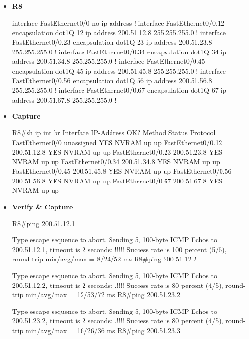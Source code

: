 \documentclass[10pt]{article}
\begin{document}
\subsection{}
\begin{itemize}
\item {\bf R8}
\begin{verbatim*}
interface FastEthernet0/0
 no ip address
!
interface FastEthernet0/0.12
 encapsulation dot1Q 12
 ip address 200.51.12.8 255.255.255.0
!
interface FastEthernet0/0.23
 encapsulation dot1Q 23
 ip address 200.51.23.8 255.255.255.0
!
interface FastEthernet0/0.34
 encapsulation dot1Q 34
 ip address 200.51.34.8 255.255.255.0
!
interface FastEthernet0/0.45
 encapsulation dot1Q 45
 ip address 200.51.45.8 255.255.255.0
!
interface FastEthernet0/0.56
 encapsulation dot1Q 56
 ip address 200.51.56.8 255.255.255.0
!
interface FastEthernet0/0.67
 encapsulation dot1Q 67
 ip address 200.51.67.8 255.255.255.0
!         
\end{verbatim*}
\item {\bf Capture}
\begin{verbatim*}
R8#sh ip int br
Interface                  IP-Address      OK? Method Status                Protocol
FastEthernet0/0            unassigned      YES NVRAM  up                    up  
FastEthernet0/0.12         200.51.12.8     YES NVRAM  up                    up  
FastEthernet0/0.23         200.51.23.8     YES NVRAM  up                    up  
FastEthernet0/0.34         200.51.34.8     YES NVRAM  up                    up  
FastEthernet0/0.45         200.51.45.8     YES NVRAM  up                    up  
FastEthernet0/0.56         200.51.56.8     YES NVRAM  up                    up  
FastEthernet0/0.67         200.51.67.8     YES NVRAM  up                    up  
\end{verbatim*}
\item {\bf Verify \& Capture}
\begin{verbatim*}
R8#ping 200.51.12.1

Type escape sequence to abort.
Sending 5, 100-byte ICMP Echos to 200.51.12.1, timeout is 2 seconds:
!!!!!
Success rate is 100 percent (5/5), round-trip min/avg/max = 8/24/52 ms
R8#ping 200.51.12.2

Type escape sequence to abort.
Sending 5, 100-byte ICMP Echos to 200.51.12.2, timeout is 2 seconds:
.!!!!
Success rate is 80 percent (4/5), round-trip min/avg/max = 12/53/72 ms
R8#ping 200.51.23.2

Type escape sequence to abort.
Sending 5, 100-byte ICMP Echos to 200.51.23.2, timeout is 2 seconds:
.!!!!
Success rate is 80 percent (4/5), round-trip min/avg/max = 16/26/36 ms
R8#ping 200.51.23.3


\end{verbatim*}
\end{itemize}
\end{document}
